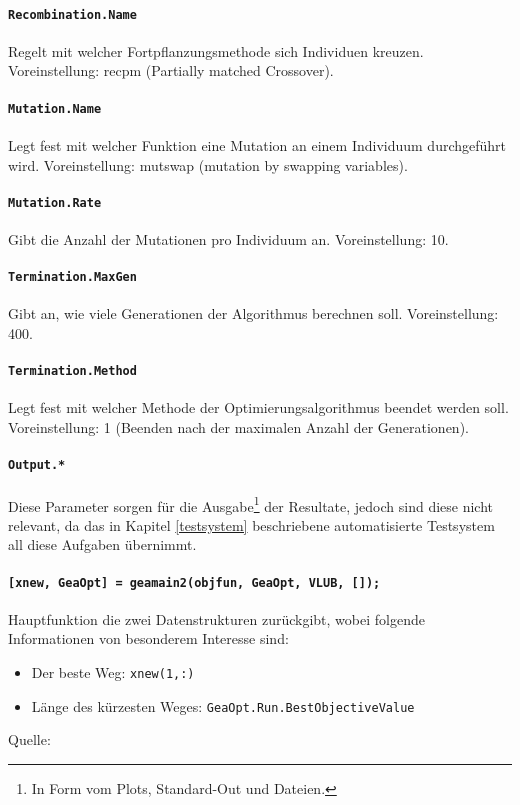 \paragraph{{\tt Recombination.Name}} Regelt mit welcher Fortpflanzungsmethode
sich Individuen kreuzen.
Voreinstellung: recpm (Partially matched Crossover).

\paragraph{{\tt Mutation.Name}} Legt fest mit welcher Funktion eine Mutation
an einem Individuum durchgeführt wird.
Voreinstellung: mutswap (mutation by swapping variables).

\paragraph{{\tt Mutation.Rate}} Gibt die Anzahl der Mutationen
pro Individuum an.
Voreinstellung: 10.

\paragraph{{\tt Termination.MaxGen}} Gibt an, wie viele Generationen der
Algorithmus berechnen soll.
Voreinstellung: 400.

\paragraph{{\tt Termination.Method}} Legt fest mit welcher Methode der
Optimierungs\-algorithmus beendet werden soll.
Voreinstellung: 1 (Beenden nach der maximalen Anzahl der Generationen).

\paragraph{{\tt Output.*}} Diese Parameter sorgen für die
Ausgabe\footnote{In Form vom Plots, Standard-Out und Dateien.} der Resultate,
jedoch sind diese nicht relevant, da das in Kapitel \ref{testsystem} beschriebene
automatisierte Testsystem all diese Aufgaben übernimmt.

\paragraph{{\tt [xnew, GeaOpt] = geamain2(objfun, GeaOpt, VLUB, []);}}
Hauptfunktion die zwei Datenstrukturen zurückgibt, wobei folgende
Informationen von besonderem Interesse sind:

\begin{itemize}
  \item Der beste Weg: {\tt xnew(1,:)}
  \item Länge des kürzesten Weges: {\tt GeaOpt.Run.BestObjectiveValue}
\end{itemize}

\noindent Quelle: \citep{geatbx-options}


